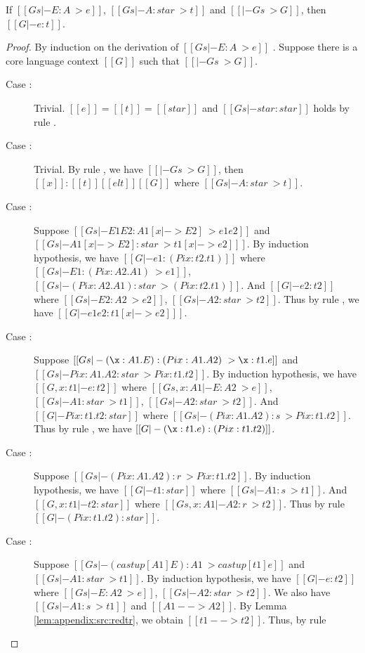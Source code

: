\begin{lem}
If $[[Gs |- E:A ~> e]]$, $[[Gs |- A:star ~> t]]$ and $[[|- Gs ~> G]]$, then
$[[G |- e:t]]$.
\end{lem}

\begin{proof}
    By induction on the derivation of $[[Gs |- E : A ~> e]]$ . Suppose there is
a core language context $[[G]]$ such that $[[|- Gs ~> G]]$.
    \begin{description}
        \item[Case :] Trivial. $[[e]] = [[t]] = [[star]]$ and
$[[Gs |- star:star]]$ holds by rule .
        \item[Case :] Trivial. By rule , we
have $[[|- Gs ~> G]]$, then $[[x]]:[[t]] [[elt]] [[G]]$ where $[[Gs |-
A:star~>t]]$.
        \item[Case :] Suppose $[[Gs |- E1 E2 : A1[x |-> E2] ~>
e1 e2]]$ and $[[Gs |- A1[x |-> E2] : star ~> t1 [x |-> e2] ]]$. By induction
hypothesis, we have $[[G |- e1 : (Pi x:t2.t1)]]$ where $[[Gs |- E1 : (Pi
x:A2.A1) ~> e1]]$, $[[Gs |- (Pi x:A2.A1) : star ~> (Pi x:t2.t1)]]$. And $[[G |-
e2:t2]]$ where $[[Gs |- E2 : A2 ~> e2]]$, $[[Gs |- A2 : star ~> t2]]$. Thus by
rule , we have $[[G |- e1 e2 : t1 [x |-> e2] ]]$.
        \item[Case :] Suppose $[[Gs |- (\x:A1.E):(Pi x:A1.A2)
~> \x:t1.e]]$ and $[[Gs |- Pi x:A1.A2 : star ~> Pi x:t1.t2]]$. By induction
hypothesis, we have $[[G, x : t1 |- e:t2]]$ where $[[Gs, x : A1 |- E : A2 ~>
e]]$, $[[Gs |- A1 : star ~> t1]]$, $[[Gs |- A2 : star ~> t2]]$. And $[[G |- Pi
x:t1.t2 : star]]$ where $[[Gs |- (Pi x:A1.A2) : s ~> Pi x:t1.t2]]$. Thus by
rule , we have $[[G |- (\x:t1.e):(Pi x:t1.t2)]]$.
        \item[Case :] Suppose $[[Gs |- (Pi x:A1.A2):r ~> Pi
x:t1.t2]]$. By induction hypothesis, we have $[[G |- t1 : star]]$ where $[[Gs
|- A1 : s ~> t1]]$. And $[[G, x : t1 |- t2 : star]]$ where $[[Gs, x: A1 |- A2 :
r ~> t2]]$. Thus by rule  $[[G |- (Pi x:t1.t2) : star]]$.
        \item[Case :] Suppose $[[Gs |- (castup[A1] E):A1 ~>
castup[t1] e]]$ and $[[Gs |- A1 : star ~> t1]]$. By induction hypothesis, we
have $[[G |- e : t2]]$ where $[[Gs |- E : A2 ~> e]]$, $[[Gs |- A2 : star ~>
t2]]$. We also have $[[Gs |- A1 : s ~> t1]]$ and $[[A1 --> A2]]$. By Lemma
\ref{lem:appendix:src:redtr}, we obtain $[[t1 --> t2]]$. Thus, by rule

\end{description}
\end{proof}
